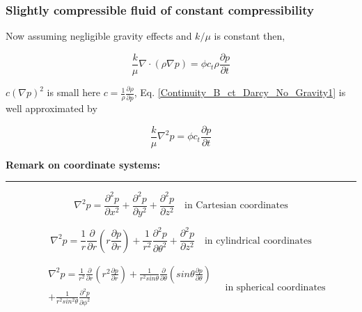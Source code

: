 \documentclass{llncs}
\numberwithin{equation}{section}
\numberwithin{figure}{section}
\numberwithin{table}{section}
\begin{document}
    \subsubsection{Slightly compressible fluid of constant compressibility}
    
    Now assuming negligible gravity effects and $k/\mu$ is constant then,

    \begin{equation}
        \frac{k}{\mu }\nabla \cdot \left( \rho \nabla p \right)=\phi {{c}_{t}}\rho \frac{\partial p}{\partial t}
    \label{Continuity_B_ct_Darcy_No_Gravity1}
    \end{equation}

     $c{{\left( \nabla p \right)}^{2}}$ is small here $c=\frac{1}{\rho }\frac{\partial \rho }{\partial p}$, Eq. \ref{Continuity_B_ct_Darcy_No_Gravity1} is well approximated by

    \begin{equation}
        \frac{k}{\mu }{{\nabla }^{2}}p=\phi {{c}_{t}}\frac{\partial p}{\partial t}
    \label{Continuity_B_ct_Darcy_No_Gravity1_approx}
    \end{equation}

    \vspace{15pt}
    \large{\textbf{Remark on coordinate systems:}}\\
    \rule{\textwidth}{1pt}

    \begin{equation*}
        {{\nabla }^{2}}p=\frac{{{\partial }^{2}}p}{\partial {{x}^{2}}}+\frac{{{\partial }^{2}}p}{\partial {{y}^{2}}}+\frac{{{\partial }^{2}}p}{\partial {{z}^{2}}}\quad \text{in Cartesian coordinates}
    \label{Laplacian_Cartesian}
    \end{equation*}

    \begin{equation*}
        {{\nabla }^{2}}p=\frac{1}{r}\frac{\partial }{\partial r}\left( r\frac{\partial p}{\partial r} \right)+\frac{1}{{{r}^{2}}}\frac{{{\partial }^{2}}p}{\partial {{\theta }^{2}}}+\frac{{{\partial }^{2}}p}{\partial {{z}^{2}}}\quad \text{in cylindrical coordinates}
    \label{Laplacian_Cylindrical}
    \end{equation*}

    \begin{equation*}
        \begin{split}
    & {{\nabla }^{2}}p=\frac{1}{{{r}^{2}}}\frac{\partial }{\partial r}\left( {{r}^{2}}\frac{\partial p}{\partial r} \right)+\frac{1}{{{r}^{2}}sin\theta }\frac{\partial }{\partial \theta }\left( sin\theta \frac{\partial p}{\partial \theta } \right) \\
    & +\frac{1}{{{r}^{2}}si{{n}^{2}}\theta }\frac{{{\partial }^{2}}p}{\partial {{\phi }^{2}}} \\
    \end{split}\quad \text{in spherical coordinates}
    \label{Laplacian_Spherical}
    \end{equation*}
\end{document}
